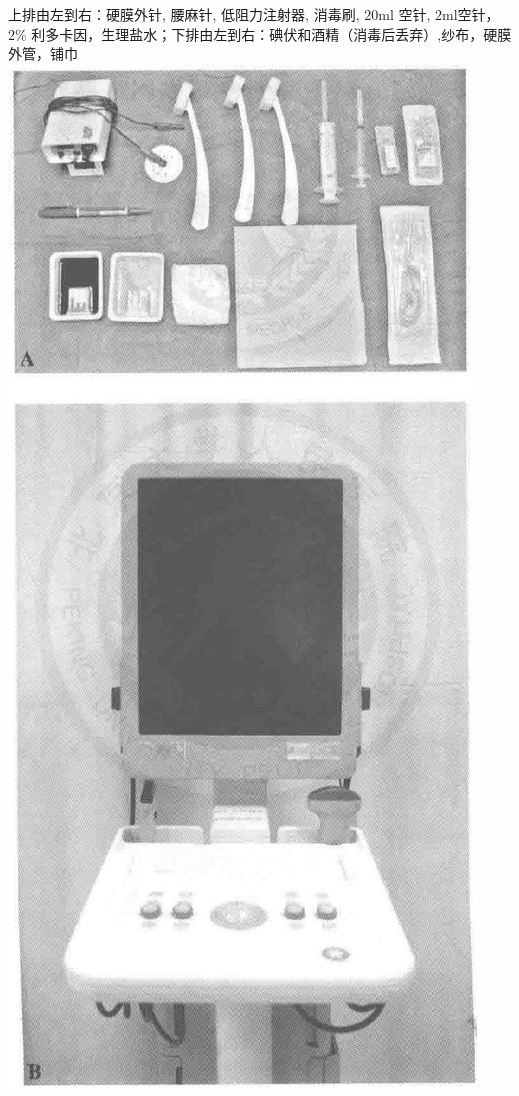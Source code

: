 \documentclass[10pt]{article}
\begin{document}
上排由左到右：硬膜外针, 腰麻针, 低阻力注射器, 消毒刷, $20 \mathrm{ml}$ 空针, $2 \mathrm{ml}$空针， $2 \%$ 利多卡因，生理盐水；下排由左到右：碘伏和酒精（消毒后丢弃）,纱布，硬膜外管，铺巾\\
\includegraphics[max width=\textwidth, center]{2024_07_05_645bb794a4d4f32ee0c8g-073}
\end{document}

